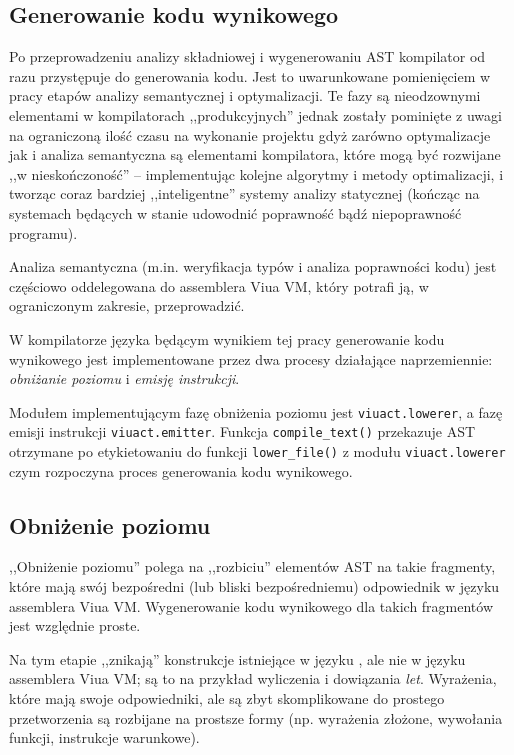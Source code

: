 \subsection{Generowanie kodu wynikowego}
\label{viuact_cc_impl_desc_codegen}

Po przeprowadzeniu analizy składniowej i wygenerowaniu AST kompilator od razu
przystępuje do generowania kodu. Jest to uwarunkowane pomienięciem w pracy
etapów analizy semantycznej i optymalizacji. Te fazy są nieodzownymi elementami
w kompilatorach ,,produkcyjnych'' jednak zostały pominięte z uwagi na
ograniczoną ilość czasu na wykonanie projektu gdyż zarówno optymalizacje jak i
analiza semantyczna są elementami kompilatora, które mogą być rozwijane ,,w
nieskończoność'' -- implementując kolejne algorytmy i metody optimalizacji, i
tworząc coraz bardziej ,,inteligentne'' systemy analizy statycznej (kończąc na
systemach będących w stanie udowodnić poprawność bądź niepoprawność programu).

Analiza semantyczna (m.in. weryfikacja typów i analiza poprawności kodu) jest
częściowo oddelegowana do assemblera Viua VM, który potrafi ją, w ograniczonym
zakresie, przeprowadzić.

W kompilatorze języka \ViuAct\phantom{} będącym wynikiem tej pracy generowanie
kodu wynikowego jest implementowane przez dwa procesy działające naprzemiennie:
\emph{obniżanie poziomu} i \emph{emisję instrukcji}.

Modułem implementującym fazę obniżenia poziomu jest \texttt{viuact.lowerer}, a
fazę emisji instrukcji \texttt{viuact.emitter}. Funkcja \texttt{compile\_text()}
przekazuje AST otrzymane po etykietowaniu do funkcji \texttt{lower\_file()} z
modułu \texttt{viuact.lowerer} czym rozpoczyna proces generowania kodu
wynikowego.

\subsection{Obniżenie poziomu}
\label{viuact_cc_impl_desc_lower}

,,Obniżenie poziomu'' polega na ,,rozbiciu'' elementów AST na takie fragmenty,
które mają swój bezpośredni (lub bliski bezpośredniemu) odpowiednik w języku
assemblera Viua VM. Wygenerowanie kodu wynikowego dla takich fragmentów jest
względnie proste.

Na tym etapie ,,znikają'' konstrukcje istniejące w języku \ViuAct, ale nie w
języku assemblera Viua VM; są to na przykład wyliczenia i dowiązania \emph{let}.
Wyrażenia, które mają swoje odpowiedniki, ale są zbyt skomplikowane do prostego
przetworzenia są rozbijane na prostsze formy (np. wyrażenia złożone, wywołania
funkcji, instrukcje warunkowe).

